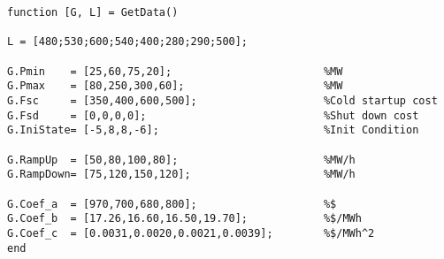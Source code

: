 \begin{verbatim}
function [G, L] = GetData()

L = [480;530;600;540;400;280;290;500];

G.Pmin    = [25,60,75,20];                        %MW
G.Pmax    = [80,250,300,60];                      %MW
G.Fsc     = [350,400,600,500];                    %Cold startup cost
G.Fsd     = [0,0,0,0];                            %Shut down cost
G.IniState= [-5,8,8,-6];                          %Init Condition

G.RampUp  = [50,80,100,80];                       %MW/h
G.RampDown= [75,120,150,120];                     %MW/h

G.Coef_a  = [970,700,680,800];                    %$
G.Coef_b  = [17.26,16.60,16.50,19.70];            %$/MWh
G.Coef_c  = [0.0031,0.0020,0.0021,0.0039];        %$/MWh^2
end
\end{verbatim}



